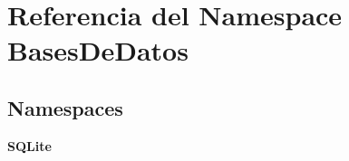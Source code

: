 \section{Referencia del Namespace Bases\-De\-Datos}
\label{namespaceBasesDeDatos}
\subsection*{Namespaces}
\begin{DoxyCompactItemize}
\item 
{\bf S\-Q\-Lite}
\end{DoxyCompactItemize}

